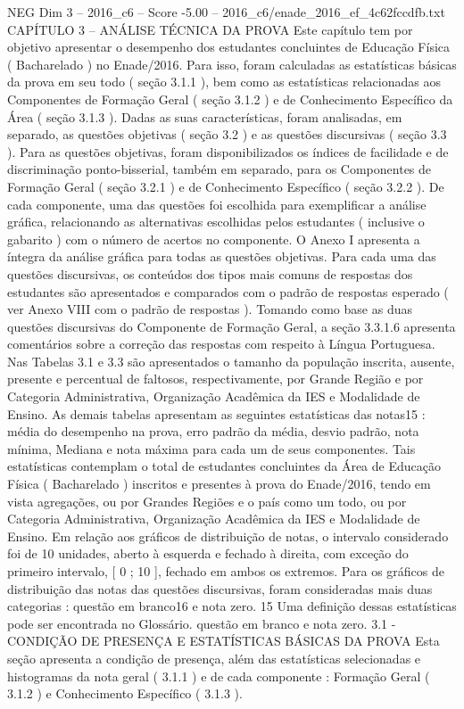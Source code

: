 \begin{textsample}{NEG Dim 3 – 2016\_c6 – Score -5.00 – 2016\_c6/enade\_2016\_ef\_4c62fccdfb.txt}  \label{ex:f3_neg_031}
CAPÍTULO 3 – ANÁLISE TÉCNICA DA PROVA Este capítulo tem por objetivo apresentar o desempenho dos estudantes concluintes de Educação Física ( Bacharelado ) no Enade/2016.
Para isso, foram calculadas as estatísticas básicas da prova em seu todo ( seção 3.1.1 ), bem como as estatísticas relacionadas aos Componentes de Formação Geral ( seção 3.1.2 ) e de Conhecimento Específico da Área ( seção 3.1.3 ).
Dadas as suas características, foram analisadas, em separado, as questões objetivas ( seção 3.2 ) e as questões discursivas ( seção 3.3 ).
Para as questões objetivas, foram disponibilizados os índices de facilidade e de discriminação ponto-bisserial, também em separado, para os Componentes de Formação Geral ( seção 3.2.1 ) e de Conhecimento Específico ( seção 3.2.2 ).
De cada componente, uma das questões foi escolhida para exemplificar a análise gráfica, relacionando as alternativas escolhidas pelos estudantes ( inclusive o gabarito ) com o número de acertos no componente.
O Anexo I apresenta a íntegra da análise gráfica para todas as questões objetivas.
Para cada uma das questões discursivas, os conteúdos dos tipos mais comuns de respostas dos estudantes são apresentados e comparados com o padrão de respostas esperado ( ver Anexo VIII com o padrão de respostas ).
Tomando como base as duas questões discursivas do Componente de Formação Geral, a seção 3.3.1.6 apresenta comentários sobre a correção das respostas com respeito à Língua Portuguesa.
Nas Tabelas 3.1 e 3.3 são apresentados o tamanho da população inscrita, ausente, presente e percentual de faltosos, respectivamente, por Grande Região e por Categoria Administrativa, Organização Acadêmica da IES e Modalidade de Ensino.
As demais tabelas apresentam as seguintes estatísticas das notas15 : média do desempenho na prova, erro padrão da média, desvio padrão, nota mínima, Mediana e nota máxima para cada um de seus componentes.
Tais estatísticas contemplam o total de estudantes concluintes da Área de Educação Física ( Bacharelado ) inscritos e presentes à prova do Enade/2016, tendo em vista agregações, ou por Grandes Regiões e o país como um todo, ou por Categoria Administrativa, Organização Acadêmica da IES e Modalidade de Ensino.
Em relação aos gráficos de distribuição de notas, o intervalo considerado foi de 10 unidades, aberto à esquerda e fechado à direita, com exceção do primeiro intervalo, [ 0 ; 10 ], fechado em ambos os extremos.
Para os gráficos de distribuição das notas das questões discursivas, foram consideradas mais duas categorias : questão em branco16 e nota zero. 15 Uma definição dessas estatísticas pode ser encontrada no Glossário. questão em branco e nota zero. 3.1 - CONDIÇÃO DE PRESENÇA E ESTATÍSTICAS BÁSICAS DA PROVA Esta seção apresenta a condição de presença, além das estatísticas selecionadas e histogramas da nota geral ( 3.1.1 ) e de cada componente : Formação Geral ( 3.1.2 ) e Conhecimento Específico ( 3.1.3 ).

\end{textsample}
